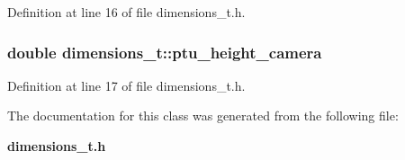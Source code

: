 \-Definition at line 16 of file dimensions\-\_\-t.\-h.

\subsubsection[{ptu\-\_\-height\-\_\-camera}]{\setlength{\rightskip}{0pt plus 5cm}double {\bf dimensions\-\_\-t\-::ptu\-\_\-height\-\_\-camera}}\label{classdimensions__t_a0c774e93697b9f970c21c7f34e43fe99}


\-Definition at line 17 of file dimensions\-\_\-t.\-h.



\-The documentation for this class was generated from the following file\-:\begin{DoxyCompactItemize}
\item 
{\bf dimensions\-\_\-t.\-h}\end{DoxyCompactItemize}

